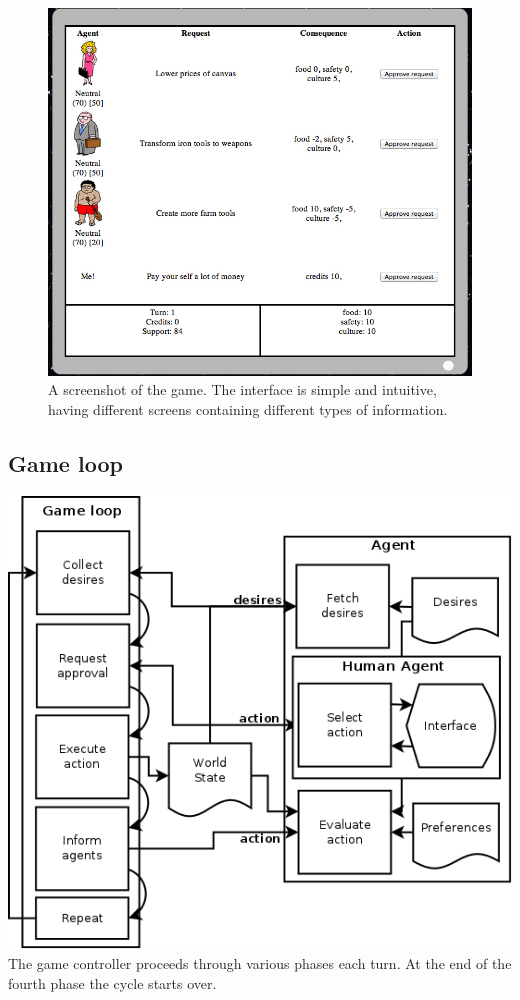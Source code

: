 \documentclass[11pt,a4paper]{article}
\begin{document}
      \begin{figure}[h!]
      \centering
      \includegraphics[scale=0.5]{screenshot}
      \caption{A screenshot of the game. The interface is simple and intuitive, having different screens containing different types of information. }
      \label{fig:scr}
      \end{figure}
  \subsection{Game loop}
    \includegraphics[scale=0.25]{gameloop.png}
    The game controller proceeds through various phases each turn. At the end of the fourth phase the cycle starts over.
\end{document}
